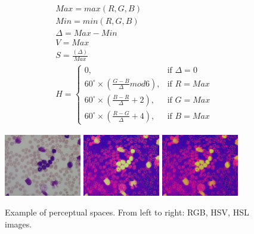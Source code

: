 \documentclass[final,a4paper,12pt,english]{UnicaPhdThesis3}
\begin{document}
\begin{equation}\label{HSV}
\begin{split}
&Max = max(R, G, B)\\
&Min = min(R, G, B)\\
&\Delta = Max-Min\\
&V = Max\\
&S = \frac{(\Delta)}{Max}\\
&H = \begin{cases} 0, & \mbox{if   } \Delta = 0 \\ 60^\circ \times \left (\frac{G-B}{\Delta} mod6 \right ), & \mbox{if   } R = Max \\  
60^\circ \times \left ( \frac{B-R}{\Delta} + 2 \right ), & \mbox{if   } G = Max\\ 
60^\circ \times \left ( \frac{R-G}{\Delta} + 4 \right ), & \mbox{if   } B = Max\end{cases} 
\end{split}
\end{equation}

\begin{figure}[!h]
	\centering
	\includegraphics[width=0.3\textwidth]{images/figcs_rgb}
	\includegraphics[width=0.3\textwidth]{images/figcs_hsv}
	\includegraphics[width=0.3\textwidth]{images/figcs_hsl}
	\caption{\label{fig:colour_spaces_per}Example of perceptual spaces. From left to right: RGB, HSV, HSL images.}
\end{figure}
\end{document}
